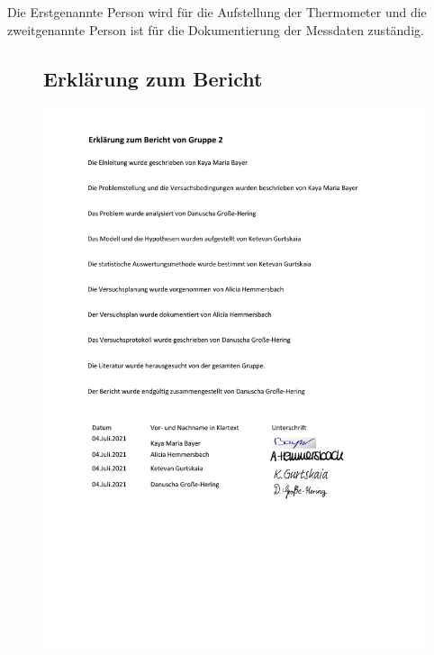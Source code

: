 \documentclass[ ngerman, fontsize= 12pt, paper=a4, headings=big, titlepage=true]{article}
\begin{document}
	Die Erstgenannte Person wird für die Aufstellung der Thermometer und die zweitgenannte Person ist für die Dokumentierung der Messdaten zuständig.	
	
	\begin{figure}[t]
		\subsection{Erklärung zum Bericht}
		\hspace{-1.3cm}
		\includegraphics[scale=0.8, page=1]{ErklaerungzumBericht}
	\end{figure}
	
	
\end{document}
